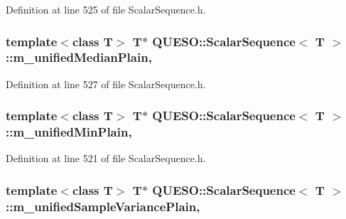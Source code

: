 Definition at line 525 of file Scalar\-Sequence.\-h.

\hypertarget{class_q_u_e_s_o_1_1_scalar_sequence_a68f724b0ff9d94f17e8ce37467a0b4f2}{
\subsubsection[{m\-\_\-unified\-Median\-Plain}]{\setlength{\rightskip}{0pt plus 5cm}template$<$class T$>$ T$\ast$ {\bf Q\-U\-E\-S\-O\-::\-Scalar\-Sequence}$<$ T $>$\-::m\-\_\-unified\-Median\-Plain\hspace{0.3cm}{\ttfamily [mutable]}, {\ttfamily [private]}}}\label{class_q_u_e_s_o_1_1_scalar_sequence_a68f724b0ff9d94f17e8ce37467a0b4f2}


Definition at line 527 of file Scalar\-Sequence.\-h.

\hypertarget{class_q_u_e_s_o_1_1_scalar_sequence_af43ad51e7996567d34078c7a39e1ca7f}{
\subsubsection[{m\-\_\-unified\-Min\-Plain}]{\setlength{\rightskip}{0pt plus 5cm}template$<$class T$>$ T$\ast$ {\bf Q\-U\-E\-S\-O\-::\-Scalar\-Sequence}$<$ T $>$\-::m\-\_\-unified\-Min\-Plain\hspace{0.3cm}{\ttfamily [mutable]}, {\ttfamily [private]}}}\label{class_q_u_e_s_o_1_1_scalar_sequence_af43ad51e7996567d34078c7a39e1ca7f}


Definition at line 521 of file Scalar\-Sequence.\-h.

\hypertarget{class_q_u_e_s_o_1_1_scalar_sequence_acf018e219da854046c5127a39ddf8442}{
\subsubsection[{m\-\_\-unified\-Sample\-Variance\-Plain}]{\setlength{\rightskip}{0pt plus 5cm}template$<$class T$>$ T$\ast$ {\bf Q\-U\-E\-S\-O\-::\-Scalar\-Sequence}$<$ T $>$\-::m\-\_\-unified\-Sample\-Variance\-Plain\hspace{0.3cm}{\ttfamily [mutable]}, {\ttfamily [private]}}}\label{class_q_u_e_s_o_1_1_scalar_sequence_acf018e219da854046c5127a39ddf8442}


